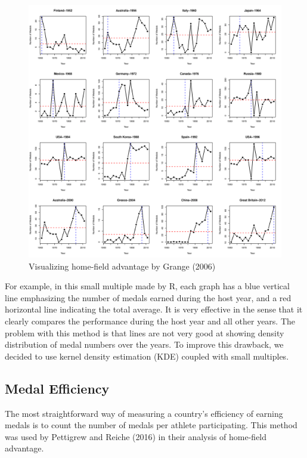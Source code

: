 \documentclass[
]{article}
\begin{document}
\begin{figure}

{\centering \includegraphics[width=1.2\linewidth]{static/pics/2-2} 

}

\caption{Visualizing home-field advantage by Grange (2006)}\label{fig:figure05}
\end{figure}

For example, in this small multiple made by R, each graph has a blue vertical line emphasizing the number of medals earned during the host year, and a red horizontal line indicating the total average. It is very effective in the sense that it clearly compares the performance during the host year and all other years. The problem with this method is that lines are not very good at showing density distribution of medal numbers over the years. To improve this drawback, we decided to use kernel density estimation (KDE) coupled with small multiples.

\hypertarget{lit-medal}{%
\subsection{Medal Efficiency}\label{lit-medal}}

The most straightforward way of measuring a country's efficiency of earning medals is to count the number of medals per athlete participating. This method was used by Pettigrew and Reiche (2016) in their analysis of home-field advantage.
\end{document}
